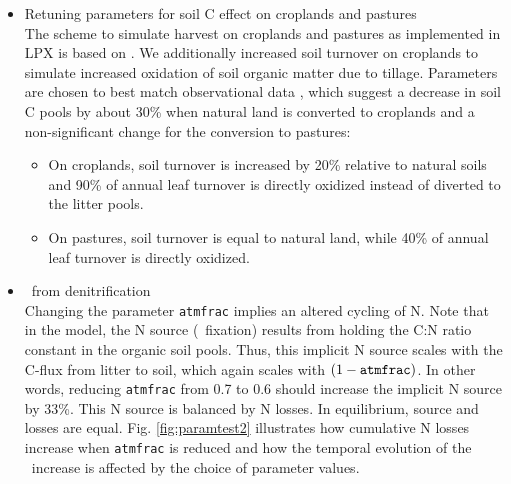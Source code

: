 \begin{itemize}
\item \textsf{Retuning parameters for soil C effect on croplands and pastures}\\
    The scheme to simulate harvest on croplands and pastures as implemented in LPX is based on \citet{shevliakova09gbc}. We additionally increased soil turnover on croplands to simulate increased oxidation of soil organic matter due to tillage. Parameters are chosen to best match observational data \citet{davidson93, murty02gcb, guogifford02gcb}, which suggest a decrease in soil C pools by about 30\% when natural land is converted to croplands and a non-significant change for the conversion to pastures:
    \begin{itemize}
      \item On croplands, soil turnover is increased by 20\% relative to natural soils and 90\% of annual leaf turnover is directly oxidized instead of diverted to the litter pools.
      \item On pastures, soil turnover is equal to natural land, while 40\% of annual leaf turnover is directly oxidized.
    \end{itemize}


\item \textsf{\nno\ from denitrification}\\
  Changing the parameter {\tt atmfrac} implies an altered cycling of N. Note that in the model, the N source (\nn\ fixation) results from holding the C:N ratio constant in the organic soil pools. Thus, this implicit N source scales with the C-flux from litter to soil, which again scales with $(1-\text{\tt atmfrac})$. In other words, reducing {\tt atmfrac} from 0.7 to 0.6 should increase the implicit N source by 33\%. This N source is balanced by N losses. In equilibrium, source and losses are equal. Fig. \ref{fig:paramtest2} illustrates how cumulative N losses increase when {\tt atmfrac} is reduced and how the temporal evolution of the \nno\ increase is affected by the choice of parameter values. 


\end{itemize}
